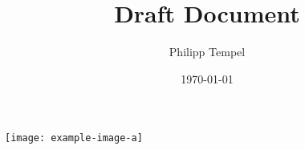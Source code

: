 \documentclass[%
    draft,%
  ]{article}
\title{Draft Document}
\author{Philipp Tempel}
\date{\today}
\begin{document}
\maketitle

\texttt{[image: example-image-a]}
\end{document}
